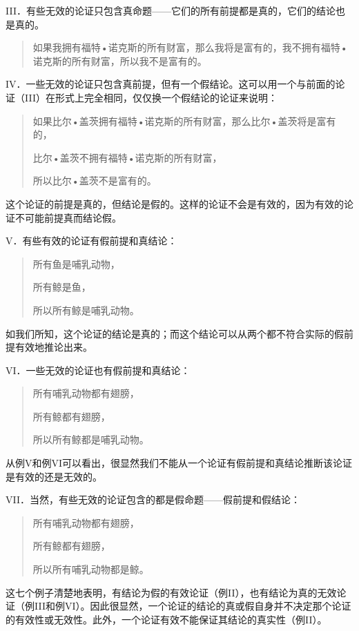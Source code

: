 III．有些无效的论证只包含真命题——它们的所有前提都是真的，它们的结论也是真的。

\begin{quotation}
如果我拥有福特•诺克斯的所有财富，那么我将是富有的，我不拥有福特•诺克斯的所有财富，所以我不是富有的。
\end{quotation}

IV．一些无效的论证只包含真前提，但有一个假结论。这可以用一个与前面的论证（III）在形式上完全相同，仅仅换一个假结论的论证来说明：

\begin{quotation}
如果比尔•盖茨拥有福特•诺克斯的所有财富，那么比尔•盖茨将是富有的，

比尔•盖茨不拥有福特•诺克斯的所有财富，

所以比尔•盖茨不是富有的。
\end{quotation}

这个论证的前提是真的，但结论是假的。这样的论证不会是有效的，因为有效的论证不可能前提真而结论假。

V．有些有效的论证有假前提和真结论：

\begin{quotation}
所有鱼是哺乳动物，

所有鲸是鱼，

所以所有鲸是哺乳动物。
\end{quotation}

如我们所知，这个论证的结论是真的；而这个结论可以从两个都不符合实际的假前提有效地推论出来。

VI．一些无效的论证也有假前提和真结论：

\begin{quotation}
所有哺乳动物都有翅膀，

所有鲸都有翅膀，

所以所有鲸都是哺乳动物。
\end{quotation}

从例V和例VI可以看出，很显然我们不能从一个论证有假前提和真结论推断该论证是有效的还是无效的。

VII．当然，有些无效的论证包含的都是假命题——假前提和假结论：

\begin{quotation}
所有哺乳动物都有翅膀，

所有鲸都有翅膀，

所以所有哺乳动物都是鲸。
\end{quotation}

这七个例子清楚地表明，有结论为假的有效论证（例II），也有结论为真的无效论证（例III和例VI）。因此很显然，一个论证的结论的真或假自身并不决定那个论证的有效性或无效性。此外，一个论证有效不能保证其结论的真实性（例II）。

